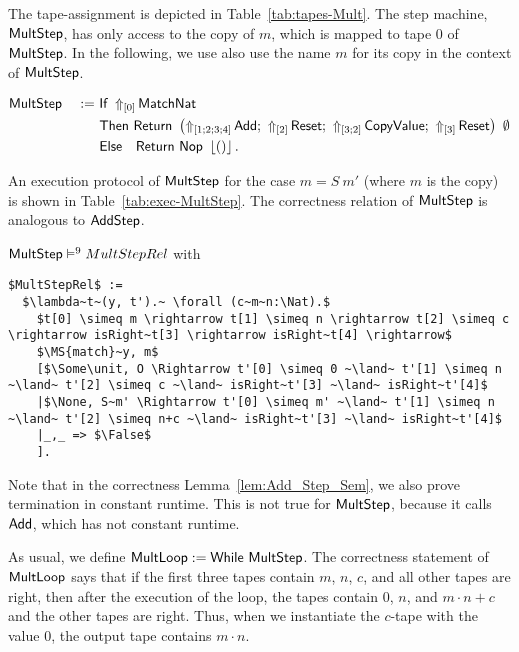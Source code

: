The tape-assignment is depicted in Table~\ref{tab:tapes-Mult}.  The step machine, $\MS{MultStep}$, has only access to the copy of $m$, which is mapped
to tape $0$ of $\MS{MultStep}$.  In the following, we use also use the name $m$ for its copy in the context of $\MS{MultStep}$.
\begin{definition}
  \label{def:Mult_Step}
  \begin{alignat*}{2}
    &\MS{MultStep} &~:=~&
           \MS{If}~\LiftTapes{\MS{MatchNat}}{\Vector{0}} \\
    &&& \MS{Then}  ~\Return{\left( \LiftTapes{\MS{Add}}{\Vector{1;2;3;4}} \Seq
                                \LiftTapes{\MS{Reset}}{\Vector{2}} \Seq
                                \LiftTapes{\MS{CopyValue}}{\Vector{3;2}} \Seq
                                \LiftTapes{\MS{Reset}}{\Vector{3}} \right)}{\None} \\
    &&& \MS{Else}~~~\Return{\MS{Nop}}{\Some\unit}.
  \end{alignat*}
\end{definition}
An execution protocol of $\MS{MultStep}$ for the case $m=S~m'$ (where $m$ is the copy) is shown in Table~\ref{tab:exec-MultStep}.  The correctness
relation of $\MS{MultStep}$ is analogous to $\MS{AddStep}$.
\begin{lemma}
  \label{lem:Mult_Step_Sem}
  $\MS{MultStep} \RealiseIn{9} MultStepRel$ with
  \small
\begin{lstlisting}[style=semicoqstyle]
$MultStepRel$ :=
  $\lambda~t~(y, t').~ \forall (c~m~n:\Nat).$
    $t[0] \simeq m \rightarrow t[1] \simeq n \rightarrow t[2] \simeq c \rightarrow isRight~t[3] \rightarrow isRight~t[4] \rightarrow$
    $\MS{match}~y, m$
    [$\Some\unit, O \Rightarrow t'[0] \simeq 0 ~\land~ t'[1] \simeq n ~\land~ t'[2] \simeq c ~\land~ isRight~t'[3] ~\land~ isRight~t'[4]$
    |$\None, S~m' \Rightarrow t'[0] \simeq m' ~\land~ t'[1] \simeq n ~\land~ t'[2] \simeq n+c ~\land~ isRight~t'[3] ~\land~ isRight~t'[4]$
    |_,_ => $\False$
    ].
\end{lstlisting}
\end{lemma}
Note that in the correctness Lemma~\ref{lem:Add_Step_Sem}, we also prove termination in constant runtime.  This is not true for $\MS{MultStep}$,
because it calls $\MS{Add}$, which has not constant runtime.

As usual, we define $\MS{MultLoop} := \While~\MS{MultStep}$.  The correctness statement of $\MS{MultLoop}$ says that if the first three tapes contain
$m$, $n$, $c$, and all other tapes are right, then after the execution of the loop, the tapes contain $0$, $n$, and $m \cdot n + c$ and the other
tapes are right.  Thus, when we instantiate the $c$-tape with the value $0$, the output tape contains $m \cdot n$.

